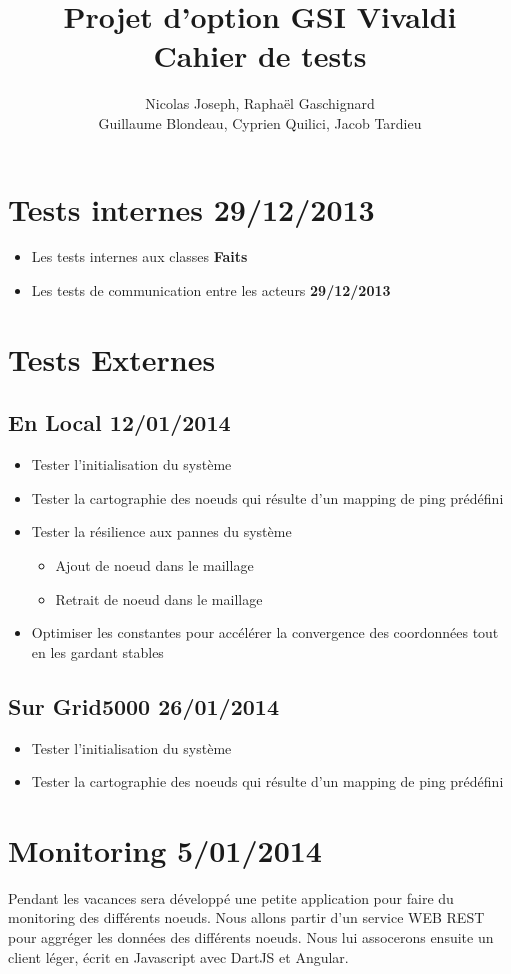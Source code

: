 \documentclass[11pt,a4paper]{article}
\title{Projet d'option GSI Vivaldi \\ Cahier de tests}
\author{Nicolas Joseph, Raphaël Gaschignard\\ Guillaume Blondeau, Cyprien Quilici, Jacob Tardieu}
\begin{document}
\maketitle

\section{Tests internes \hfill 29/12/2013}
\begin{itemize}
\item Les tests internes aux classes  \hfill \textbf{Faits}
\item Les tests de communication entre les acteurs \hfill \textbf{29/12/2013}
\end{itemize}

\section{Tests Externes}
\subsection{En Local \hfill \textbf{12/01/2014}}

\begin{itemize}
\item Tester l’initialisation du système
\item Tester la cartographie des noeuds qui résulte d’un mapping de ping prédéfini
\item Tester la résilience aux pannes du système
\begin{itemize}
\item Ajout de noeud dans le maillage
\item Retrait de noeud dans le maillage
\end{itemize}
\item Optimiser les constantes pour accélérer la convergence des coordonnées tout en les gardant stables
\end{itemize}

\subsection{Sur Grid5000  \hfill \textbf{26/01/2014}}
\begin{itemize}
\item Tester l’initialisation du système
\item Tester la cartographie des noeuds qui résulte d’un mapping de ping prédéfini
\end{itemize}

\section{Monitoring \hfill 5/01/2014}
Pendant les vacances sera développé une petite application pour faire du monitoring des différents noeuds. Nous allons partir d'un service WEB REST pour aggréger les données des différents noeuds. Nous lui assocerons ensuite un client léger, écrit en Javascript avec DartJS et Angular.
\end{document}
